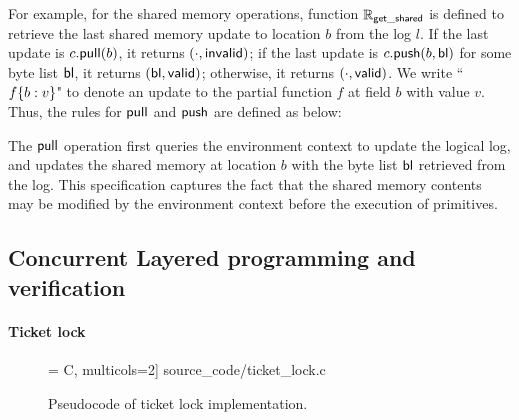 {For example, for the shared memory operations, function
$\mathbb{R}_{\mathsf{get\_shared}}$  is defined to retrieve the last shared memory
update to location $b$ from the log $l$. If the last update is
$c.\mathsf{pull}(b)$, it returns $(\cdot, \mathsf{invalid})$; if the last update
is $c.\mathsf{push}(b,\mathsf{bl})$
for some byte list $\mathsf{bl}$, 
 it returns $(\mathsf{bl}, \mathsf{valid})$;
otherwise, it returns $(\cdot, \mathsf{valid})$.
We write ``$f\{b:v\}$"
to denote an update to the partial function $f$ at field $b$ 
with value $v$.
Thus, the rules for $\mathsf{pull}$ and $\mathsf{push}$
are defined as below:
\begin{small}
\end{small}

The $\mathsf{pull}$ operation first queries the environment context to update
the logical log, and updates the shared memory at 
location $b$ with the byte
list $\mathsf{bl}$ retrieved from the log. This specification
captures the fact that the shared memory contents may be
modified by the environment context before the execution of
primitives.

\subsection{Concurrent Layered programming and verification}
\label{sec:prog:example}}


\paragraph{Ticket lock}
\begin{figure}
 = C, multicols=2] {source_code/ticket_lock.c}
\vspace{-10pt}
\caption{Pseudocode of ticket lock implementation.}
\label{fig:exp:ticket_lock}
\vspace{-10pt}
\end{figure}

